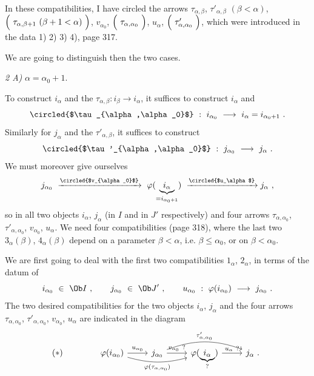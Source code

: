 In these compatibilities, I have circled the arrows $\tau_{\alpha,\beta}$, $\tau'_{\alpha,\beta}$ $(\beta<\alpha)$, $\Bigl(\ \tau_{\alpha,\beta+1}\ (\beta+1<\alpha)\ \Bigr)$, $v_{\alpha_0}$, $\Bigl(\ \tau_{\alpha,\alpha_0}\ \Bigr)$, $u_\alpha$, $\Bigl(\ \tau'_{\alpha,\alpha_0}\ \Bigr)$, which were introduced in the data 1) 2) 3) 4), page 317. %


We are going to distinguish then the two cases.

\textit{2 A)} $\alpha=\alpha_0+1$.

To construct $i_\alpha$ and the $\tau_{\alpha,\beta}:i_\beta\longrightarrow i_\alpha$, it suffices to construct $i_\alpha$ and
\[
\circled{$\tau_{\alpha,\alpha_0}$}\ :\ i_{\alpha_0}\ \longrightarrow\ i_\alpha=i_{\alpha_0+1}\ .
\]
Similarly for $j_\alpha$ and the $\tau'_{\alpha,\beta}$, it suffices to construct
\[
\circled{$\tau'_{\alpha,\alpha_0}$}\ :\ j_{\alpha_0}\ \longrightarrow\ j_\alpha\ .
\]
We must moreover give ourselves
\[
j_{\alpha_0}\ \xrightarrow{\circled{$v_{\alpha_0}$}}\ \varphi(\underbrace{\,i_\alpha\,}_{=i_{\alpha_0+1}})\ \xrightarrow{\circled{$u_\alpha$}} j_\alpha\ ,
\]
so in all two objects $i_\alpha$, $j_\alpha$ (in $I$ and in $J'$ respectively) and four arrows $\tau_{\alpha,\alpha_0}$, $\tau'_{\alpha,\alpha_0}$, $v_{\alpha_0}$, $u_\alpha$. We need four compatibilities (page 318), where the last two $3_\alpha(\beta)$, $4_\alpha(\beta)$ depend on a parameter $\beta<\alpha$, i.e. $\beta\leqslant\alpha_0$, or on $\beta<\alpha_0$.



We are first going to deal with the first two compatibilities $1_\alpha$, $2_\alpha$, in terms of the datum of
\[
i_{\alpha_0}\ \in\ \Ob I\ ,\qquad j_{\alpha_0}\ \in\ \Ob J'\ ,\qquad u_{\alpha_0}\ :\ \varphi(i_{\alpha_0})\ \longrightarrow\ j_{\alpha_0}\ .
\]
The two desired compatibilities for the two objects $i_\alpha$, $j_\alpha$ and the four arrows $\tau_{\alpha,\alpha_0}$, $\tau'_{\alpha,\alpha_0}$, $v_{\alpha_0}$, $u_\alpha$ are indicated in the diagram
\[
(*)\qquad\qquad
\begin{tikzcd}
\varphi(i_{\alpha_0}) \arrow[r, "u_{\alpha_0}"] \arrow[rr, bend right=15, "\varphi(\tau_{\alpha,\alpha_0})"'] & j_{\alpha_0} \arrow[r, "v_{\alpha_0}\ ?"] \arrow[rr, bend left=20, "\tau'_{\alpha,\alpha_0}"] & \varphi(\underbrace{\,i_\alpha\,}_{?}) \arrow[r, "u_\alpha\ ?"] & j_\alpha\ .
\end{tikzcd}
\]

